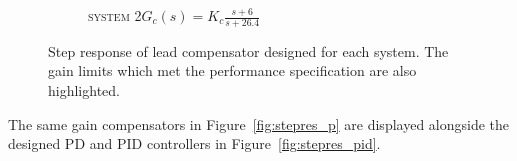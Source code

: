 \documentclass[a4paper,10pt,twocolumn]{article}
\begin{document}
\begin{figure}[h!]
\begin{subfigure}{0.5\textwidth}
		\caption{\textsc{system 2}\quad\footnotesize$\displaystyle G_c(s) = K_c\frac{s+6}{s+26.4}$}
	\end{subfigure}
	\caption{Step response of lead compensator designed for each system. The gain limits which met the performance specification are also highlighted.}
	\label{fig:stepres_lead}
\end{figure}

The same gain compensators in Figure~\ref{fig:stepres_p} are displayed alongside the designed PD and PID controllers in Figure~\ref{fig:stepres_pid}.
\end{document}
